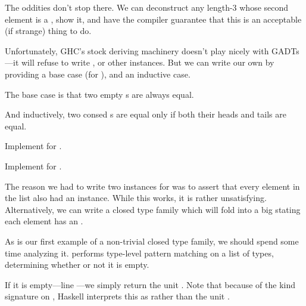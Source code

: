 \documentclass[book.tex]{subfiles}
\begin{document}

The oddities don't stop there. We can deconstruct any length-3  whose
second element is a , show it, and have the compiler guarantee that
this is an acceptable (if strange) thing to do.


Unfortunately, GHC's stock deriving machinery doesn't play nicely with
GADTs---it will refuse to write ,  or other instances. But we
can write our own by providing a base case (for ), and an inductive
case.

The base case is that two empty s are always equal.


And inductively, two consed s are equal only if both their heads and
tails are equal.


\begin{exercise}
Implement  for .
\end{exercise}
\begin{solution}
\end{solution}

\begin{exercise}
Implement  for .
\end{exercise}
\begin{solution}
\end{solution}

The reason we had to write two instances for  was to assert that every
element in the list also had an  instance. While this works, it is rather
unsatisfying. Alternatively, we can write a closed type family which will fold
 into a big  stating each element has an .


As  is our first example of a non-trivial closed type family, we
should spend some time analyzing it.  performs type-level pattern
matching on a list of types, determining whether or not it is empty.

If it is empty---line ---we simply return the unit .
Note that because of the \gls{kind signature} on , Haskell interprets this
as  rather than the unit .
\end{document}
